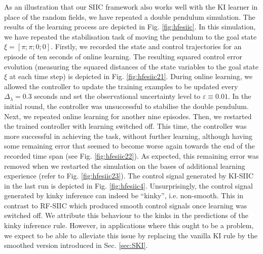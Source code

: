 As an illustration that our SIIC framework also works well with the KI learner in place of the random fields, we have repeated a double pendulum simulation. The results of the learning process are depicted in Fig. \ref{fig:hfesiic}. In this simulation, we have repeated the stabilisation task of moving the pendulum to the goal state $\xi =[\pi;\pi;0;0]$. Firstly, we recorded the state and control trajectories for an episode of ten seconds of online learning. The resulting squared control error evolution (measuring the squared distances of the state variables to the goal state $\xi$ at each time step) is depicted in Fig. \ref{fig:hfesiic21}. During online learning, we allowed the controller to update the training examples to be updated every $\Delta_\lambda = 0.3$ seconds and set the observational uncertainty level to $\varepsilon \equiv 0.01$. In the initial round, the controller was unsuccessful to stabilise the double pendulum. Next, we repeated online learning for another nine episodes. Then, we restarted the trained controller with learning switched off. This time, the controller was more successful in achieving the task, without further learning, although having some remaining error that seemed to become worse again towards the end of the recorded time span (see Fig. \ref{fig:hfesiic22}). As expected, this remaining error was removed when we restarted the simulation on the bases of additional learning experience (refer to  Fig. \ref{fig:hfesiic23}). The control signal generated by KI-SIIC in the last run is depicted in Fig. \ref{fig:hfesiic4}. 
Unsurprisingly, the control signal generated by kinky inference can indeed be ``kinky'', i.e. non-smooth. This in contrast to RF-SIIC which produced smooth control signals once learning was switched off. We attribute this behaviour to the kinks in the predictions of the kinky inference rule. However, in applications where this ought to be a problem, we expect to be able to alleviate this issue by replacing the vanilla KI rule by the smoothed version introduced in Sec. \ref{sec:SKI}.



